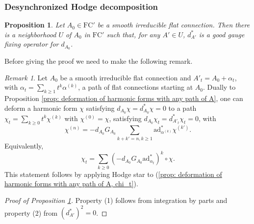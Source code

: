 \documentclass[11pt,a4paper]{amsart}
\theoremstyle{plain} %
\newtheorem{prop}[thm]{Proposition}
\theoremstyle{definition}
\theoremstyle{remark}
\newtheorem{rem}[thm]{Remark}
\newcommand{\ra}{\rightarrow}
\newcommand{\M}{\mathcal{M}}
\newcommand{\sm}{\mathrm{sm}}
\newcommand{\til}{\widetilde}
\newcommand{\ad}{\mathrm{ad}}
\newcommand{\FC}{\mathrm{FC}}
\begin{document}
{\subsubsection{Desynchronized Hodge decomposition}

\begin{prop} \label{lem: Hodge decomposition close connections}
    Let $A_0\in \FC'$ be a smooth irreducible flat connection. 
    Then there is a neighborhood $U$ of $A_0$ in $\FC'$ such that,  for any $A' \in U$, $d^*_{A'}$ is a good gauge fixing operator for $d_{A_0}$. 
\end{prop}
Before giving the proof we need to make the following remark.
\begin{rem}\label{rem: change of harm form under change of gf operator}
Let $A_0$ be a smooth irreducible flat connection and $A'_t = A_0 + \alpha_t$, with $\alpha_t=\sum_{k \geq 1}t^k \alpha^{(k)}$, a path of flat connections starting at $A_0$.
    Dually to Proposition \ref{prop: deformation of harmonic forms with any path of A}, one can deform a harmonic form $\chi$ satisfying $d_{A_0}\chi = d^*_{A_0}\chi = 0$ to a path $\chi_t=\sum_{k\geq 0}t^k\chi^{(k)}$ with $\chi^{(0)}=\chi$, satisfying $d_{A_0}\chi_t = d_{A'_t}^*\chi_t = 0$, with 
    $$
    \chi^{(n)} = -d_{A_0}G_{A_0}\sum_{k+k' = n, k\geq 1}\mathrm{ad}^*_{\alpha^{(k)}}\chi^{(k')}.
    $$
    Equivalently,
    $$
    \chi_t=\sum_{k\geq 0}(-d_{A_0}G_{A_0}\ad^*_{\alpha_t})^k\circ \chi.
    $$
    This statement follows by applying Hodge star to (\ref{prop: deformation of harmonic forms with any path of A, chi_t}).
\end{rem}


\begin{proof}[Proof of Proposition \ref{lem: Hodge decomposition close connections}]
Property (1) follows from integration by parts and property (2) from $(d_{A'}^*)^2 = 0$. 


\end{proof}}
\end{document}

